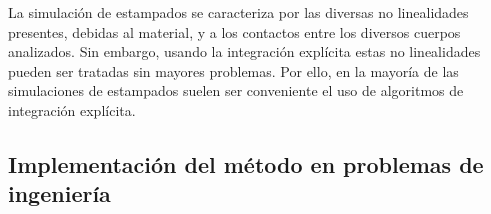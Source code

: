 La simulación de estampados se caracteriza por las diversas no linealidades presentes, debidas al 
material, y a los contactos entre los diversos cuerpos analizados. Sin embargo, usando la integración 
explícita estas no linealidades pueden ser tratadas sin mayores problemas. Por ello, en la mayoría de 
las simulaciones de estampados suelen ser conveniente el uso de algoritmos de integración explícita.


\subsection{Implementación del método en problemas de ingeniería}




